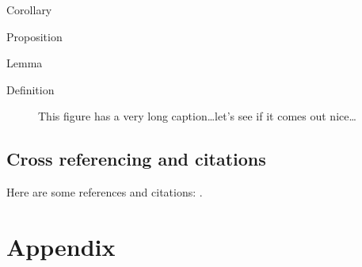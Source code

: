 \documentclass[english,counters by chapter]{uniud}
\begin{document}
\begin{corollary}
	\label{cor:first}
	Corollary
\end{corollary}

\begin{proposition}
	\label{prop:first}
	Proposition
\end{proposition}

\begin{lemma}
	\label{lem:first}
	Lemma
\end{lemma}

\begin{definition}
	\label{def:first}
	Definition
\end{definition}

\begin{remark}
	\label{rem:first}
	\blindtext[1]
\end{remark}

\begin{figure}[t]
	\begin{center}
	\end{center}
	\caption{This figure has a very long caption\dots let's see if it comes out nice\dots}
	\label{fig:first}
\end{figure}

\section{Cross referencing and citations}

Here are some references and citations:   \cite{article,book,booklet,conference,inbook,incollection,manual,mastersthesis,misc,phdthesis,proceedings,techreport,unpublished}.





\printbibliography

\appendix

\chapter{Appendix}
\lipsum[1-7]
\end{document}

